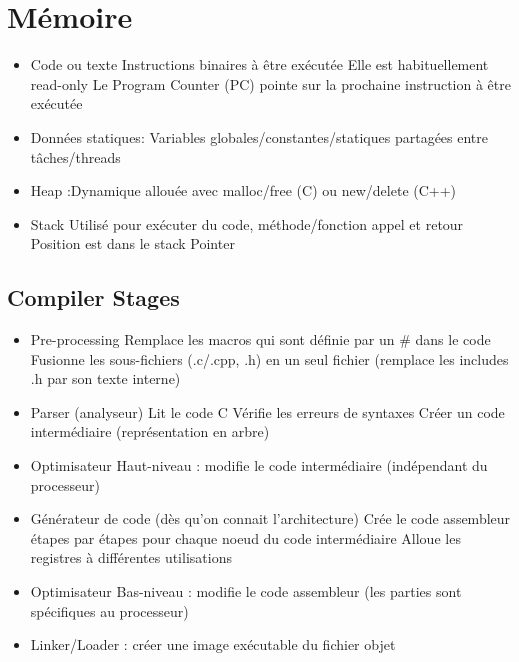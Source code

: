 \documentclass[resume]{subfiles}
\begin{document}
\section{Mémoire}
\begin{itemize}
\item Code ou texte
  \subitem Instructions binaires à être exécutée
  \subitem Elle est habituellement read-only
  \subitem Le Program Counter (PC) pointe sur la prochaine instruction à être exécutée
\item Données statiques: Variables globales/constantes/statiques partagées entre tâches/threads
\item Heap :Dynamique allouée avec malloc/free (C) ou new/delete (C++)
\item Stack
  \subitem Utilisé pour exécuter du code, méthode/fonction appel et retour
  \subitem Position est dans le stack Pointer
\end{itemize}

\subsection{Compiler Stages}
\begin{itemize}
\item Pre-processing
  \subitem Remplace les macros qui sont définie par un \# dans le code
  \subitem Fusionne les sous-fichiers (.c/.cpp, .h) en un seul fichier (remplace les includes .h par son texte interne)
\item Parser (analyseur)
  \subitem Lit le code C
  \subitem Vérifie les erreurs de syntaxes
  \subitem Créer un code intermédiaire (représentation en arbre)
\item Optimisateur Haut-niveau : modifie le code intermédiaire (indépendant du processeur)
\item Générateur de code (dès qu'on connait l'architecture)
  \subitem Crée le code assembleur étapes par étapes pour chaque noeud du code intermédiaire
  \subitem Alloue les registres à différentes utilisations
\item Optimisateur Bas-niveau : modifie le code assembleur (les parties sont spécifiques au processeur)
\item Linker/Loader : créer une image exécutable du fichier objet
\end{itemize}
\end{document}

